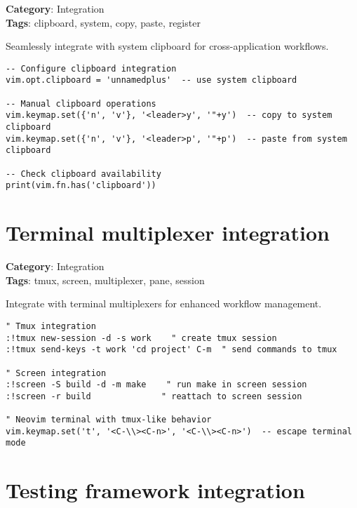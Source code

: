 {{{{{\textbf{Category}: Integration\\ \textbf{Tags}: clipboard, system, copy, paste, register
\vspace{0.5cm}

Seamlessly integrate with system clipboard for cross-application workflows.

\begin{Exa*}{}
\begin{Verbatim}[fontsize=\footnotesize, breaklines, breakanywhere]
-- Configure clipboard integration
vim.opt.clipboard = 'unnamedplus'  -- use system clipboard

-- Manual clipboard operations
vim.keymap.set({'n', 'v'}, '<leader>y', '"+y')  -- copy to system clipboard
vim.keymap.set({'n', 'v'}, '<leader>p', '"+p')  -- paste from system clipboard

-- Check clipboard availability
print(vim.fn.has('clipboard'))
\end{Verbatim}
\end{Exa*}

\section{Terminal multiplexer integration}

\textbf{Category}: Integration\\ \textbf{Tags}: tmux, screen, multiplexer, pane, session
\vspace{0.5cm}

Integrate with terminal multiplexers for enhanced workflow management.

\begin{Exa*}{}
\begin{Verbatim}[fontsize=\footnotesize, breaklines, breakanywhere]
" Tmux integration
:!tmux new-session -d -s work    " create tmux session
:!tmux send-keys -t work 'cd project' C-m  " send commands to tmux

" Screen integration  
:!screen -S build -d -m make    " run make in screen session
:!screen -r build              " reattach to screen session

" Neovim terminal with tmux-like behavior
vim.keymap.set('t', '<C-\\><C-n>', '<C-\\><C-n>')  -- escape terminal mode
\end{Verbatim}
\end{Exa*}

\section{Testing framework integration}

}}}}}
